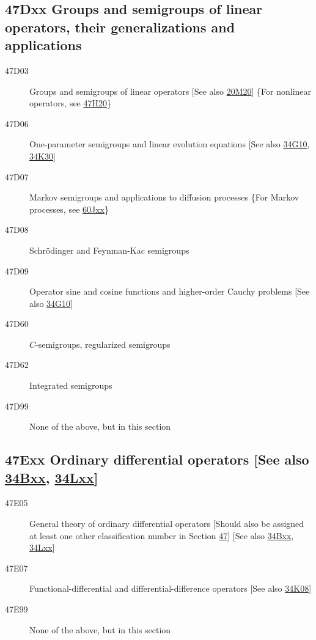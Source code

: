 \documentclass[letterpaper]{article}
\begin{document}
\subsection*{47Dxx  Groups and semigroups of linear operators, their generalizations and applications }\label{47Dxx}
\begin{description}  
\item [47D03]\label{47D03} Groups and semigroups of linear operators [See also \hyperref[20M20]{20M20}] \{For nonlinear operators, see \hyperref[47H20]{47H20}\}
\item [47D06]\label{47D06} One-parameter semigroups and linear evolution equations [See also \hyperref[34G10]{34G10}, \hyperref[34K30]{34K30}]
\item [47D07]\label{47D07} Markov semigroups and applications to diffusion processes \{For Markov processes, see \hyperref[60Jxx]{60Jxx}\}
\item [47D08]\label{47D08} Schr\"{o}dinger and Feynman-Kac semigroups
\item [47D09]\label{47D09} Operator sine and cosine functions and higher-order Cauchy problems [See also \hyperref[34G10]{34G10}]
\item [47D60]\label{47D60} $C$-semigroups, regularized semigroups
\item [47D62]\label{47D62} Integrated semigroups
\item [47D99]\label{47D99} None of the above, but in this section
\end{description}
\subsection*{47Exx  Ordinary differential operators [See also \hyperref[34Bxx]{34Bxx}, \hyperref[34Lxx]{34Lxx}] }\label{47Exx}
\begin{description}  
\item [47E05]\label{47E05} General theory of ordinary differential operators [Should also be assigned at least one other classification number in Section \hyperref[47-XX]{47}] [See also \hyperref[34Bxx]{34Bxx}, \hyperref[34Lxx]{34Lxx}]
\item [47E07]\label{47E07} Functional-differential and differential-difference operators [See also \hyperref[34K08]{34K08}]
\item [47E99]\label{47E99} None of the above, but in this section
\end{description}
\end{document}
